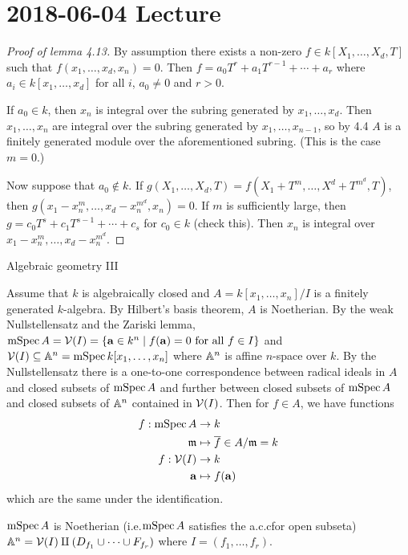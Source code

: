 \section{2018-06-04 Lecture}

\begin{proof}[Proof of lemma 4.13]
  By assumption there exists a non-zero $f \in k[X_1,\ldots,X_d,T]$ such that $f(x_1,\ldots,x_d,x_n)=0$.
  Then $f=a_0T^r+a_1T^{r-1}+\cdots+a_r$ where $a_i \in k[x_1,\ldots,x_d]$ for all $i$, $a_0 \neq 0$ and $r>0$.

  If $a_0 \in k$, then $x_n$ is integral over the subring generated by $x_1,\ldots,x_d$.
  Then $x_1,\ldots,x_n$ are integral over the subring generated by $x_1,\ldots,x_{n-1}$, so by 4.4 $A$ is a finitely generated module over the aforementioned subring.
  (This is the case $m=0$.)

  Now suppose that $a_0 \notin k$.
  If $g(X_1,\ldots,X_d,T)=f(X_1+T^m,\ldots,X^d+T^{m^d},T)$, then $g(x_1-x_n^m,\ldots,x_d-x_n^{m^d},x_n)=0$.
  If $m$ is sufficiently large, then $g=c_0T^s+c_1T^{s-1}+\cdots+c_s$ for $c_0 \in k$ (check this).
  Then $x_n$ is integral over $x_1-x_n^m,\ldots,x_d-x_n^{m^d}$.
\end{proof}

Algebraic geometry III

Assume that $k$ is algebraically closed and $A=k[x_1,\ldots,x_n]/I$ is a finitely generated $k$-algebra.
By Hilbert's basis theorem, $A$ is Noetherian.
By the weak Nullstellensatz and the Zariski lemma, $\operatorname{mSpec} A = \mathcal{V}(I) = \{ \mathbf{a} \in k^n \mid f(\mathbf{a})=0 \text{ for all } f \in I \}$ and $\mathcal{V}(I) \subseteq \mathbb{A}^n = \operatorname{mSpec} k[x_1,\ldots,x_n]$ where $\mathbb{A}^n$ is affine $n$-space over $k$.
By the Nullstellensatz there is a one-to-one correspondence between radical ideals in $A$ and closed subsets of $\operatorname{mSpec} A$ and further between closed subsets of $\operatorname{mSpec} A$ and closed subsets of $\mathbb{A}^n$ contained in $\mathcal{V}(I)$.
Then for $f \in A$, we have functions
\begin{align*}
  f: \operatorname{mSpec} A &\to k \\
  \mathfrak{m} &\mapsto \overline f \in A/\mathfrak{m} = k \\
  f: \mathcal{V}(I) &\to k \\
  \mathbf{a} &\mapsto f(\mathbf{a})
\end{align*}
which are the same under the identification.

\begin{lem}[AG.12]
  \lv
  \begin{enum}
    \io $\operatorname{mSpec} A$ is Noetherian (i.e.\@ $\operatorname{mSpec} A$ satisfies the a.c.c\@ for open subseta)
    \io $\mathbb{A}^n = \mathcal{V}(I) \amalg (D_{f_1} \cup \cdots \cup F_{f_r})$ where $I=(f_1,\ldots,f_r)$.
  \end{enum}
\end{lem}


